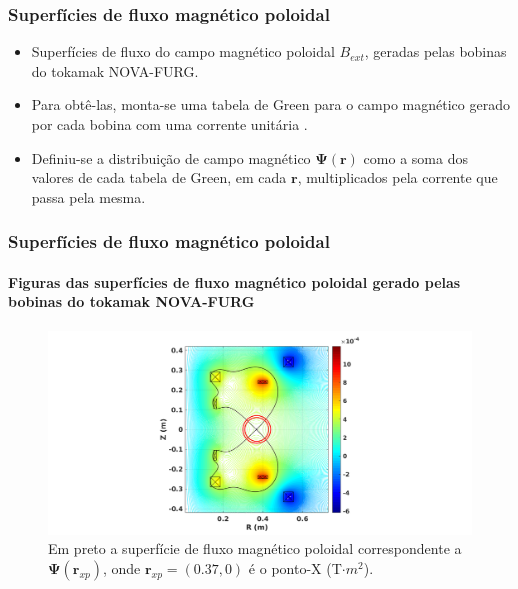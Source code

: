 \documentclass[aspectratio=169]{beamer}
\begin{document}
\begin{frame}		
\frametitle{ Superfícies de fluxo magnético poloidal }
\begin{itemize}
\item Superfícies de fluxo do campo magnético poloidal $B_{ext}$, geradas pelas bobinas do tokamak NOVA-FURG.
\item Para obtê-las, monta-se uma tabela de Green para o campo magnético gerado por cada bobina com uma corrente unitária \cite{MagneticControl}.
\item Definiu-se a distribuição de campo magnético $\bm{\Psi}(\bm{r})$ como a soma dos valores de cada tabela de Green, em cada $\bm{r}$, multiplicados pela corrente que passa pela mesma.
\end{itemize}
\end{frame}


\begin{frame}		
\frametitle{ Superfícies de fluxo magnético poloidal }
\framesubtitle{Figuras das superfícies de fluxo magnético poloidal gerado pelas bobinas do tokamak NOVA-FURG}

		\begin{figure}[H]
\centering %
\includegraphics[scale=0.3]{campo001-2.png} 
\caption{Em preto a superfície de fluxo magnético poloidal correspondente a $\bm{\Psi}(\bm{r}_{xp})$, onde $\bm{r}_{xp}=(0.37,0)$ é o ponto-X (T$\cdot m^2$).}
\label{fig: equipotenc}
\end{figure}

\end{frame}
\end{document}
